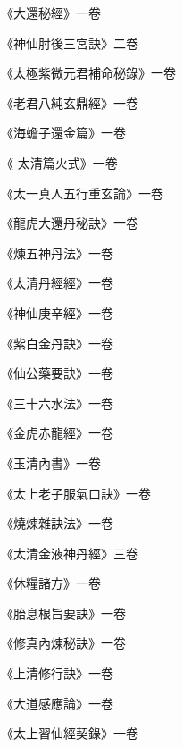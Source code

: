 \begin{pinyinscope}
 《大還秘經》一卷



 《神仙肘後三宮訣》二卷



 《太極紫微元君補命秘錄》一卷



 《老君八純玄鼎經》一卷



 《海蟾子還金篇》一卷



 《
 太清篇火式》一卷



 《太一真人五行重玄論》一卷



 《龍虎大還丹秘訣》一卷



 《煉五神丹法》一卷



 《太清丹經經》一卷



 《神仙庚辛經》一卷



 《紫白金丹訣》一卷



 《仙公藥要訣》一卷



 《三十六水法》一卷



 《金虎赤龍經》一卷



 《玉清內書》一卷



 《太上老子服氣口訣》一卷



 《燒煉雜訣法》一卷



 《太清金液神丹經》三卷



 《休糧諸方》一卷



 《胎息根旨要訣》一卷



 《修真內煉秘訣》一卷



 《上清修行訣》一卷



 《大道感應論》一卷



 《太上習仙經契錄》一卷




\end{pinyinscope}
